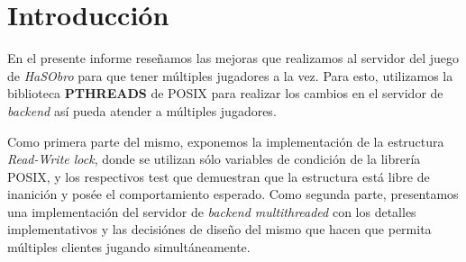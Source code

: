 \section{Introducción}

En el presente informe reseñamos las mejoras que realizamos al servidor del juego de \textit{HaSObro} para que tener múltiples jugadores a la vez. Para esto, utilizamos la biblioteca \textbf{PTHREADS} de POSIX para realizar los cambios en el servidor de \textit{backend} así pueda atender a múltiples jugadores.

Como primera parte del mismo, exponemos la implementación de la estructura \textit{Read-Write lock}, donde se utilizan sólo variables de condición de la librería POSIX, y los respectivos test que demuestran que la estructura está libre de inanición y posée el comportamiento esperado. Como segunda parte, presentamos una implementación del servidor de \textit{backend multithreaded} con los detalles implementativos y las decisiónes de diseño del mismo que hacen que permita múltiples clientes jugando simultáneamente.